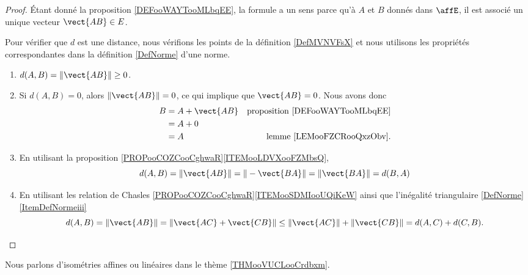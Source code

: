 \begin{proof}
	Étant donné la proposition \ref{DEFooWAYTooMLbqEE}, la formule a un sens parce qu'à \( A\) et \( B\) donnés dans \( \affE\), il est associé un unique vecteur \( \vect{ AB }\in E\).

	Pour vérifier que \( d\) est une distance, nous vérifions les points de la définition \ref{DefMVNVFsX} et nous utilisons les propriétés correspondantes dans la définition \ref{DefNorme} d'une norme.
	\begin{enumerate}
		\item
		      \( d(A,B)= \| \vect{ AB } \|\geq 0\).
		\item
		      Si \( d(A,B)=0\), alors \( \| \vect{ AB } \|=0\), ce qui implique que \( \vect{ AB }=0\). Nous avons donc
		      \begin{subequations}
			      \begin{align}
				      B & =A+\vect{ AB } & \text{proposition \ref{DEFooWAYTooMLbqEE}} \\
				        & =A+0                                                        \\
				        & =A             & \text{lemme \ref{LEMooFZCRooQxzObv}.}
			      \end{align}
		      \end{subequations}
		\item
		      En utilisant la proposition \ref{PROPooCOZCooCghwaR}\ref{ITEMooLDVXooFZMbsQ},
		      \begin{equation}
			      d(A,B)=\| \vect{ AB } \|=\| -\vect{ BA } \|=\| \vect{ BA } \|=d(B,A)
		      \end{equation}
		\item
		      En utilisant les relation de Chasles \ref{PROPooCOZCooCghwaR}\ref{ITEMooSDMIooUQiKeW} ainsi que l'inégalité triangulaire \ref{DefNorme}\ref{ItemDefNormeiii}
		      \begin{equation}
			      d(A,B)=\| \vect{ AB } \|=\| \vect{ AC }+\vect{ CB } \|\leq \| \vect{ AC } \|+\| \vect{ CB } \|=d(A,C)+d(C,B).
		      \end{equation}
	\end{enumerate}
\end{proof}

Nous parlons d'isométries affines ou linéaires dans le thème \ref{THMooVUCLooCrdbxm}.
